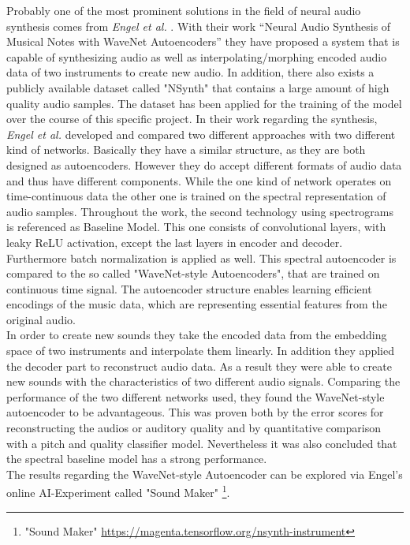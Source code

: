 Probably one of the most prominent solutions in the field of neural audio synthesis comes from \textit{Engel et al.} \cite{Engel2017}. With their work “Neural Audio Synthesis of Musical Notes with WaveNet Autoencoders” they have proposed a system that is capable of synthesizing audio as well as interpolating/morphing encoded audio data of two instruments to create new audio. In addition, there also exists a publicly available dataset called "NSynth" \cite{Engel2017} that contains a large amount of high quality audio samples. The dataset has been applied for the training of the model over the course of this specific project. In their work regarding the synthesis, \textit{Engel et al.} developed and compared two different approaches with two different kind of networks. Basically they have a similar structure, as they are both designed as autoencoders. However they do accept different formats of audio data and thus have different components. While the one kind of network operates on time-continuous data the other one is trained on the spectral representation of audio samples. Throughout the work, the second technology using spectrograms is referenced as Baseline Model. This one consists of convolutional layers, with leaky ReLU activation, except the last layers in encoder and decoder. Furthermore batch normalization is applied as well. This spectral autoencoder is compared to the so called "WaveNet-style Autoencoders", that are trained on continuous time signal. The autoencoder structure enables learning efficient encodings of the music data, which are representing essential features from the original audio.\\
In order to create new sounds they take the encoded data from the embedding space of two instruments and interpolate them linearly. In addition they applied the decoder part to reconstruct audio data. As a result they were able to create new sounds with the characteristics of two different audio signals. Comparing the performance of the two different networks used, they found the WaveNet-style autoencoder to be advantageous. This was proven both by the error scores for reconstructing the audios or auditory quality and by quantitative comparison with a pitch and quality classifier model. Nevertheless it was also concluded that the spectral baseline model has a strong performance.\\
The results regarding the WaveNet-style Autoencoder can be explored via Engel's online AI-Experiment called "Sound Maker" \footnote{"Sound Maker" \url{https://magenta.tensorflow.org/nsynth-instrument}}.

